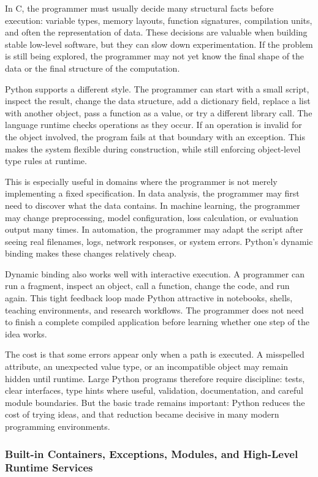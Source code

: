 In C, the programmer must usually decide many structural facts before execution: variable types, memory layouts, function signatures, compilation units, and often the representation of data. These decisions are valuable when building stable low-level software, but they can slow down experimentation. If the problem is still being explored, the programmer may not yet know the final shape of the data or the final structure of the computation.

Python supports a different style. The programmer can start with a small script, inspect the result, change the data structure, add a dictionary field, replace a list with another object, pass a function as a value, or try a different library call. The language runtime checks operations as they occur. If an operation is invalid for the object involved, the program fails at that boundary with an exception. This makes the system flexible during construction, while still enforcing object-level type rules at runtime.

This is especially useful in domains where the programmer is not merely implementing a fixed specification. In data analysis, the programmer may first need to discover what the data contains. In machine learning, the programmer may change preprocessing, model configuration, loss calculation, or evaluation output many times. In automation, the programmer may adapt the script after seeing real filenames, logs, network responses, or system errors. Python's dynamic binding makes these changes relatively cheap.

Dynamic binding also works well with interactive execution. A programmer can run a fragment, inspect an object, call a function, change the code, and run again. This tight feedback loop made Python attractive in notebooks, shells, teaching environments, and research workflows. The programmer does not need to finish a complete compiled application before learning whether one step of the idea works.

The cost is that some errors appear only when a path is executed. A misspelled attribute, an unexpected value type, or an incompatible object may remain hidden until runtime. Large Python programs therefore require discipline: tests, clear interfaces, type hints where useful, validation, documentation, and careful module boundaries. But the basic trade remains important: Python reduces the cost of trying ideas, and that reduction became decisive in many modern programming environments.

\subsubsection{Built-in Containers, Exceptions, Modules, and High-Level Runtime Services}

